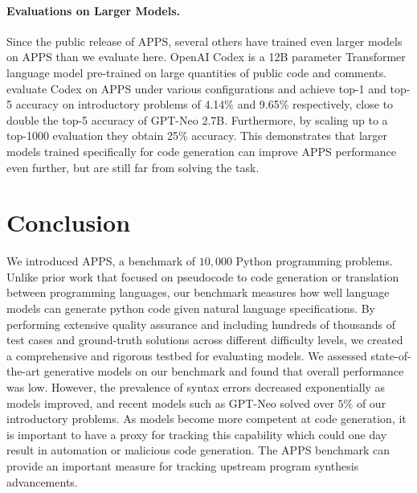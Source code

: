 \documentclass{article}
\begin{document}
\paragraph{Evaluations on Larger Models.}
Since the public release of APPS, several others have trained even larger models on APPS than we evaluate here. OpenAI Codex is a 12B parameter Transformer language model pre-trained on large quantities of public code and comments. \citet{chen2021evaluating} evaluate Codex on APPS under various configurations and achieve top-1 and top-5 accuracy on introductory problems of 4.14\% and 9.65\% respectively, close to double the top-5 accuracy of GPT-Neo 2.7B. Furthermore, by scaling up to a top-1000 evaluation they obtain 25\% accuracy. This demonstrates that larger models trained specifically for code generation can improve APPS performance even further, but are still far from solving the task. \section{Conclusion}
We introduced APPS, a benchmark of $10,\!000$ Python programming problems. Unlike prior work that focused on pseudocode to code generation or translation between programming languages, our benchmark measures how well language models can generate python code given natural language specifications. By performing extensive quality assurance and including hundreds of thousands of test cases and ground-truth solutions across different difficulty levels, we created a comprehensive and rigorous testbed for evaluating models. We assessed state-of-the-art generative models on our benchmark and found that overall performance was low. However, the prevalence of syntax errors decreased exponentially as models improved, and recent models such as GPT-Neo solved over $5\%$ of our introductory problems. As models become more competent at code generation, it is important to have a proxy for tracking this capability which could one day result in automation or malicious code generation. The APPS benchmark can provide an important measure for tracking upstream program synthesis advancements.


 






\newpage

\appendix
\end{document}
